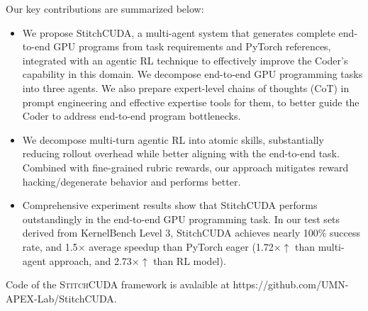 Our key contributions are summarized below:
\begin{itemize}

\vspace{-0.2cm}
    \item We propose StitchCUDA, a multi-agent system that generates complete end-to-end GPU programs from task requirements and PyTorch references, integrated with an agentic RL technique to effectively improve the Coder's capability in this domain. We decompose end-to-end GPU programming tasks into three agents. We also prepare expert-level chains of thoughts (CoT) in prompt engineering and effective expertise tools for them, to better guide the Coder to address end-to-end program bottlenecks.   

    \vspace{-0.2cm}
    \item We decompose multi-turn agentic RL into atomic skills, substantially reducing rollout overhead while better aligning with the end-to-end task. Combined with fine-grained rubric rewards, our approach mitigates reward hacking/degenerate behavior and performs better.

    \vspace{-0.2cm}
    \item Comprehensive experiment results show that StitchCUDA performs outstandingly in the end-to-end GPU programming task. In our test sets derived from KernelBench Level 3, StitchCUDA achieves nearly 100\% success rate, and 1.5$\times$ average speedup than PyTorch eager (1.72$\times$$\uparrow$ than multi-agent approach, and 2.73$\times$$\uparrow$ than RL model).  
\end{itemize}
Code of the \textsc{StitchCUDA} framework is avalaible at https://github.com/UMN-APEX-Lab/StitchCUDA.

